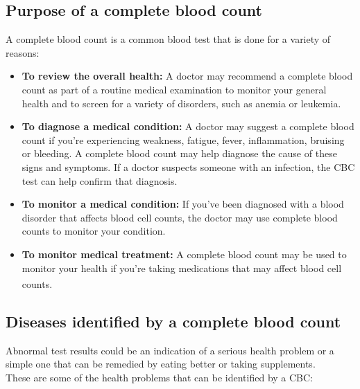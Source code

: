 \subsection{Purpose of a complete blood count}
\hspace{\parindent}
A complete blood count is a common blood test that is done for a variety of reasons:

\begin{itemize}
  \item \textbf{To review the overall health:} A doctor may recommend a complete blood count as part of a routine medical examination to monitor your general health and to screen for a variety of disorders, such as anemia or leukemia.
  \item \textbf{To diagnose a medical condition:} A doctor may suggest a complete blood count if you're experiencing weakness, fatigue, fever, inflammation, bruising or bleeding. A complete blood count may help diagnose the cause of these signs and symptoms. If a doctor suspects someone with an infection, the CBC test can help confirm that diagnosis.
  \item \textbf{To monitor a medical condition:} If you've been diagnosed with a blood disorder that affects blood cell counts, the doctor may use complete blood counts to monitor your condition.
  \item \textbf{To monitor medical treatment:} A complete blood count may be used to monitor your health if you're taking medications that may affect blood cell counts. \textsuperscript{\cite{CBC-mayoclinic}}
\end{itemize}

\subsection{Diseases identified by a complete blood count}
\hspace{\parindent}
Abnormal test results could be an indication of a serious health problem or a simple one that can be remedied by eating better or taking supplements.\\
These are some of the health problems that can be identified by a CBC:

